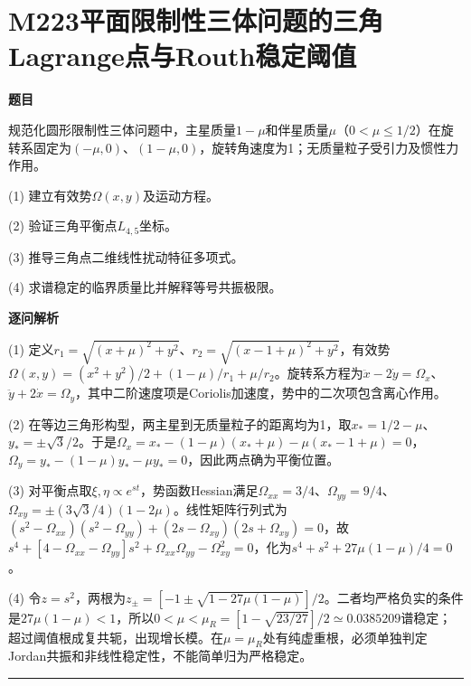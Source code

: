 \documentclass[UTF8,a4paper,11pt,oneside,openany]{ctexbook}
\begin{document}
\section*{M223\quad 平面限制性三体问题的三角Lagrange点与Routh稳定阈值}
\textbf{题目}\par
规范化圆形限制性三体问题中，主星质量$1-\mu$和伴星质量$\mu$（$0<\mu\le1/2$）在旋转系固定为$(-\mu,0)$、$(1-\mu,0)$，旋转角速度为1；无质量粒子受引力及惯性力作用。
\par\smallskip\noindent (1) 建立有效势$\Omega(x,y)$及运动方程。
\par\smallskip\noindent (2) 验证三角平衡点$L_{4,5}$坐标。
\par\smallskip\noindent (3) 推导三角点二维线性扰动特征多项式。
\par\smallskip\noindent (4) 求谱稳定的临界质量比并解释等号共振极限。
\par\medskip\textbf{逐问解析}\par
\par\smallskip\noindent (1) 定义$r_1=\sqrt{(x+\mu)^2+y^2}$、$r_2=\sqrt{(x-1+\mu)^2+y^2}$，有效势$\Omega(x,y)=(x^2+y^2)/2+(1-\mu)/r_1+\mu/r_2$。旋转系方程为$\ddot x-2\dot y=\Omega_x$、$\ddot y+2\dot x=\Omega_y$，其中二阶速度项是Coriolis加速度，势中的二次项包含离心作用。
\par\smallskip\noindent (2) 在等边三角形构型，两主星到无质量粒子的距离均为1，取$x_*=1/2-\mu$、$y_*=\pm\sqrt3/2$。于是$\Omega_x=x_*-(1-\mu)(x_*+\mu)-\mu(x_*-1+\mu)=0$，$\Omega_y=y_*-(1-\mu)y_*-\mu y_*=0$，因此两点确为平衡位置。
\par\smallskip\noindent (3) 对平衡点取$\xi,\eta\propto e^{st}$，势函数Hessian满足$\Omega_{xx}=3/4$、$\Omega_{yy}=9/4$、$\Omega_{xy}=\pm(3\sqrt3/4)(1-2\mu)$。线性矩阵行列式为$(s^2-\Omega_{xx})(s^2-\Omega_{yy})+(2s-\Omega_{xy})(2s+\Omega_{xy})=0$，故$s^4+[4-\Omega_{xx}-\Omega_{yy}]s^2+\Omega_{xx}\Omega_{yy}-\Omega_{xy}^2=0$，化为$s^4+s^2+27\mu(1-\mu)/4=0$。
\par\smallskip\noindent (4) 令$z=s^2$，两根为$z_\pm=[-1\pm\sqrt{1-27\mu(1-\mu)}]/2$。二者均严格负实的条件是$27\mu(1-\mu)<1$，所以$0<\mu<\mu_R=[1-\sqrt{23/27}]/2\simeq0.0385209$谱稳定；超过阈值根成复共轭，出现增长模。在$\mu=\mu_R$处有纯虚重根，必须单独判定Jordan共振和非线性稳定性，不能简单归为严格稳定。
\par\medskip\hrule\medskip
\end{document}
